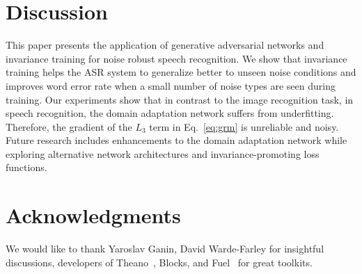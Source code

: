 \documentclass{article}
\begin{document}
\section{Discussion}
\label{sec:discussion}
    This paper presents the application of generative adversarial networks and invariance training for noise robust speech recognition. We show that invariance training 
    helps the ASR system to generalize better to unseen noise conditions and improves word error rate when a small number of noise types are seen during training. Our 
    experiments show that in contrast to the image recognition task, in speech recognition,  the domain adaptation network suffers from underfitting. Therefore, the 
    gradient of the $L_3$ term in Eq.~\ref{eq:grm} is unreliable and noisy. Future research includes enhancements to the domain adaptation network while exploring alternative network architectures and invariance-promoting loss functions.

\section*{Acknowledgments}

We would like to thank Yaroslav Ganin, David Warde-Farley for insightful discussions,
developers of Theano~\cite{2016arXiv160502688short}, Blocks, and Fuel~\cite{MerrienboerBDSW15} 
for great toolkits.

%


\end{document}
